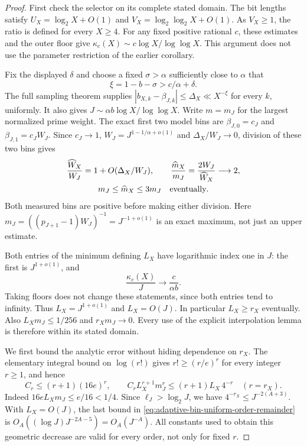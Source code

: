 \documentclass[11pt]{article}
\theoremstyle{definition}
\begin{document}
\begin{proof}
First check the selector on its complete stated domain.
The bit lengths satisfy
$U_X=\log_2X+O(1)$ and
$V_X=\log_2\log_2X+O(1)$.
As $V_X\ge1$, the ratio is defined for every $X\ge4$.
For any fixed positive rational $c$, these estimates and the
outer floor give
$\kappa_c(X)\sim c\log X/\log\log X$.
This argument does not use the parameter restriction of the
earlier corollary.

Fix the displayed $\delta$ and choose a fixed $\sigma>\alpha$
sufficiently close to $\alpha$ that
\[
 \xi=1-b-\sigma>c/\alpha+\delta .
\]
The full sampling theorem supplies
$|b_{X,k}-\beta_{J,k}|\le\Delta_X\ll X^{-\xi}$
for every $k$, uniformly.
It also gives
$J\sim\alpha b\log X/\log\log X$.
Write $m=m_J$ for the largest normalized prime weight.
The exact first two model bins are
$\beta_{J,0}=c_J$ and $\beta_{J,1}=c_JW_J$.
Since $c_J\to1$, $W_J=J^{1-1/\alpha+o(1)}$ and
$\Delta_X/W_J\to0$, division of these two bins gives
\begin{equation}
 \begin{gathered}
 \frac{\widehat W_X}{W_J}=1+O(\Delta_X/W_J),\qquad
 \frac{\widehat m_X}{m_J}
             =\frac{2W_J}{\widehat W_X}\longrightarrow2,\\
 m_J\le\widehat m_X\le3m_J\quad\hbox{eventually}.
 \end{gathered}
 \label{eq:adaptive-bin-maxweight-certificate}
\end{equation}
Both measured bins are positive before making either division.
Here
$m_J=((p_{J+1}-1)W_J)^{-1}=J^{-1+o(1)}$
is an exact maximum, not just an upper estimate.

Both entries of the minimum defining $L_X$ have logarithmic
index one in $J$:
the first is $J^{1+o(1)}$, and
\[
 \frac{\kappa_c(X)}J\longrightarrow\frac{c}{\alpha b}.
\]
Taking floors does not change these statements, since both
entries tend to infinity.
Thus $L_X=J^{1+o(1)}$ and $L_X=O(J)$.
In particular $L_X\ge r_X$ eventually.
Also $L_Xm_J\le1/256$ and $r_Xm_J\to0$.
Every use of the explicit interpolation lemma is therefore
within its stated domain.

We first bound the analytic error without hiding dependence on $r_X$.
The elementary integral bound on $\log(r!)$ gives
$r!\ge(r/e)^r$ for every integer $r\ge1$, and hence
\begin{equation}
 C_r\le(r+1)(16e)^r,\qquad
 C_rL_X^{r+1}m_J^r
       \le(r+1)L_X\,4^{-r}
                   \quad(r=r_X).
 \label{eq:adaptive-bin-uniform-order-remainder}
\end{equation}
Indeed $16eL_Xm_J\le e/16<1/4$.
Since $\ell_J>\log_2J$, we have
$4^{-r_X}\le J^{-2(A+3)}$.
With $L_X=O(J)$, the last bound in
\eqref{eq:adaptive-bin-uniform-order-remainder} is
$O_A((\log J)J^{-2A-5})=O_A(J^{-A})$.
All constants used to obtain this geometric decrease are
valid for every order, not only for fixed $r$.


\end{proof}
\end{document}
